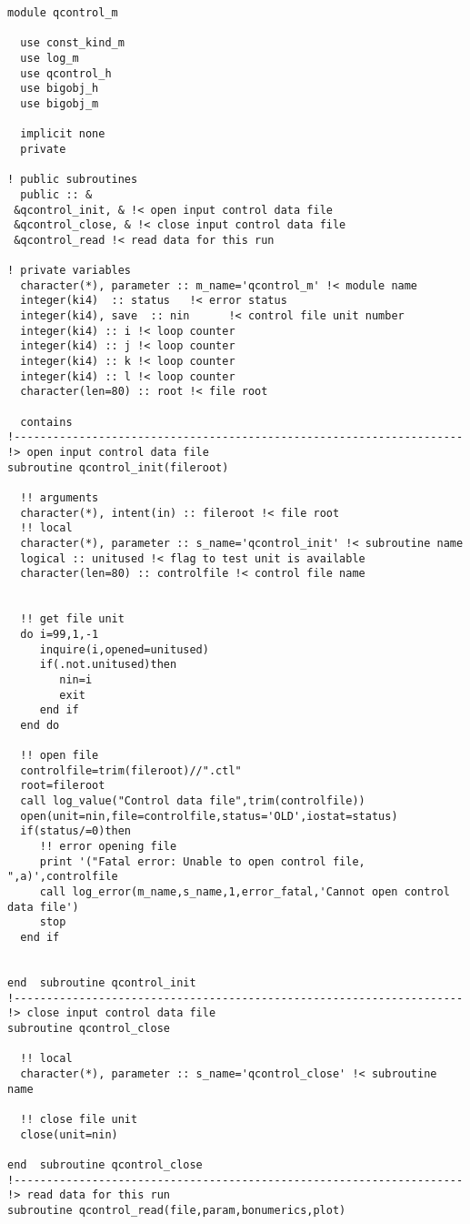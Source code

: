 \small
\begin{verbatim}
module qcontrol_m

  use const_kind_m
  use log_m
  use qcontrol_h
  use bigobj_h
  use bigobj_m

  implicit none
  private

! public subroutines
  public :: &
 &qcontrol_init, & !< open input control data file
 &qcontrol_close, & !< close input control data file
 &qcontrol_read !< read data for this run

! private variables
  character(*), parameter :: m_name='qcontrol_m' !< module name
  integer(ki4)  :: status   !< error status
  integer(ki4), save  :: nin      !< control file unit number
  integer(ki4) :: i !< loop counter
  integer(ki4) :: j !< loop counter
  integer(ki4) :: k !< loop counter
  integer(ki4) :: l !< loop counter
  character(len=80) :: root !< file root

  contains
!---------------------------------------------------------------------
!> open input control data file
subroutine qcontrol_init(fileroot)

  !! arguments
  character(*), intent(in) :: fileroot !< file root
  !! local
  character(*), parameter :: s_name='qcontrol_init' !< subroutine name
  logical :: unitused !< flag to test unit is available
  character(len=80) :: controlfile !< control file name


  !! get file unit
  do i=99,1,-1
     inquire(i,opened=unitused)
     if(.not.unitused)then
        nin=i
        exit
     end if
  end do

  !! open file
  controlfile=trim(fileroot)//".ctl"
  root=fileroot
  call log_value("Control data file",trim(controlfile))
  open(unit=nin,file=controlfile,status='OLD',iostat=status)
  if(status/=0)then
     !! error opening file
     print '("Fatal error: Unable to open control file, ",a)',controlfile
     call log_error(m_name,s_name,1,error_fatal,'Cannot open control data file')
     stop
  end if


end  subroutine qcontrol_init
!---------------------------------------------------------------------
!> close input control data file
subroutine qcontrol_close

  !! local
  character(*), parameter :: s_name='qcontrol_close' !< subroutine name

  !! close file unit
  close(unit=nin)

end  subroutine qcontrol_close
!---------------------------------------------------------------------
!> read data for this run
subroutine qcontrol_read(file,param,bonumerics,plot)


\end{verbatim}
